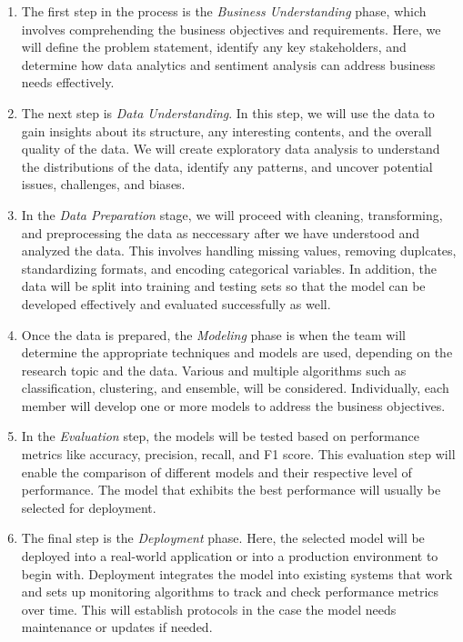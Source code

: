 \documentclass[stu,12pt,floatsintext]{apa7}
\begin{document}
\begin{enumerate}
    \item The first step in the process is the \textit{Business Understanding} phase, which involves comprehending the business objectives and requirements. Here, we will define the problem statement, identify any key stakeholders, and determine how data analytics and sentiment analysis can address business needs effectively. 
 
    \item The next step is \textit{Data Understanding}. In this step, we will use the data to gain insights about its structure, any interesting contents, and the overall quality of the data. We will create exploratory data analysis to understand the distributions of the data, identify any patterns, and uncover potential issues, challenges, and biases. 
    
    \item In the \textit{Data Preparation} stage, we will proceed with cleaning, transforming, and preprocessing the data as neccessary after we have understood and analyzed the data. This involves handling missing values, removing duplcates, standardizing formats, and encoding categorical variables. In addition, the data will be split into training and testing sets so that the model can be developed effectively and evaluated successfully as well. 
    
    \item Once the data is prepared, the \textit{Modeling} phase is when the team will determine the appropriate techniques and models are used, depending on the research topic and the data. Various and multiple algorithms such as classification, clustering, and ensemble, will be considered. Individually, each member will develop one or more models to address the business objectives.
    
    \item In the \textit{Evaluation} step, the models will be tested based on performance metrics like accuracy, precision, recall, and F1 score. This evaluation step will enable the comparison of different models and their respective level of performance. The model that exhibits the best performance will usually be selected for deployment. 
    
    \item The final step is the \textit{Deployment} phase. Here, the selected model will be deployed into a real-world application or into a production environment to begin with. Deployment integrates the model into existing systems that work and sets up monitoring algorithms to track and check performance metrics over time. This will establish protocols in the case the model needs maintenance or updates if needed. 
\end{enumerate}
\end{document}
